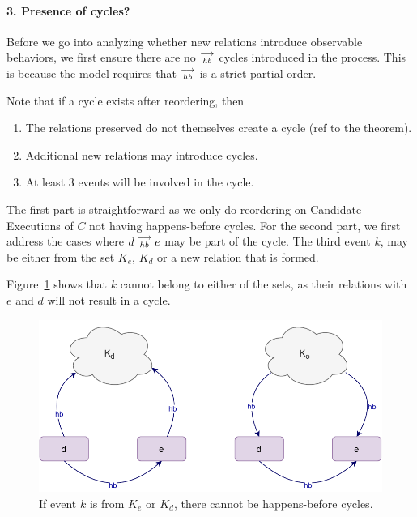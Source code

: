 \paragraph{3. Presence of cycles?}
    Before we go into analyzing whether new relations introduce observable behaviors, we first ensure there are no $\stackrel{\longrightarrow}{_\textit{hb}}$ cycles introduced in the process. 
    This is because the model requires that $\stackrel{\longrightarrow}{_{hb}}$ is a strict partial order. 
    
    Note that if a cycle exists after reordering, then 
    \begin{enumerate}
        \item The relations preserved do not themselves create a cycle (ref to the theorem).
        \item Additional new relations may introduce cycles.
        \item At least 3 events will be involved in the cycle.
    \end{enumerate}

    The first part is straightforward as we only do reordering on Candidate Executions of $C$ not having happens-before cycles. 
    For the second part, we first address the cases where $d\stackrel{\longrightarrow}{_{hb}}e$ may be part of the cycle. 
    The third event $k$, may be either from the set $K_e$, $K_d$ or a new relation that is formed.
    
    Figure~\ref{reord:cycle(a)} shows that $k$ cannot belong to either of the sets, as their relations with $e$ and $d$ will not result in a cycle. 
    \begin{figure}[H]
        \centering
        \includegraphics[scale=0.7]{4.InstructionReordering/4.ValidReorderingCandidate/ProofParts/Part3/part3(b).pdf}
        \caption{If event $k$ is from $K_e$ or $K_d$, there cannot be happens-before cycles.}
        \label{reord:cycle(a)}
    \end{figure}

